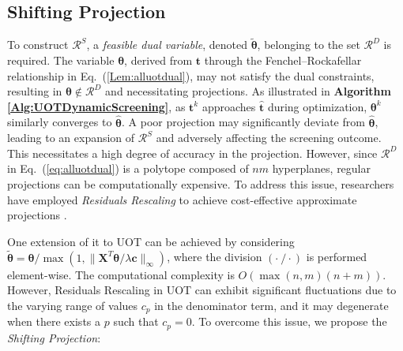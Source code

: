 \documentclass[11pt]{article}
\newcommand{\mat}[1]{\mathbf{#1}}
\renewcommand{\vec}[1]{\bm{#1}}
\begin{document}
\subsection{Shifting Projection}
\label{Sec:SP}
To construct $\mathcal{R}^S$, a {\it feasible dual variable}, denoted $\tilde{\vec{\theta}}$, belonging to the set $\mathcal{R}^{D}$ is required. The variable $\vec \theta$, derived from $\vec t$ through the Fenchel--Rockafellar relationship in Eq.~(\ref{Lem:alluotdual}), may not satisfy the dual constraints, resulting in $\vec{\theta}\notin\mathcal{R}^{D}$ and necessitating projections. As illustrated in {\bf Algorithm~ \ref{Alg:UOTDynamicScreening}}, as $\vec t^{k}$ approaches $\hat{\vec t}$ during optimization, $\vec \theta^{k}$ similarly converges to $\hat{\vec \theta}$. A poor projection may significantly deviate from $\hat{\vec{\theta}}$, leading to an expansion of $\mathcal{R}^{S}$ and adversely affecting the screening outcome. This necessitates a high degree of accuracy in the projection. However, since $\mathcal{R}^{D}$ in Eq.~(\ref{eq:alluotdual}) is a polytope composed of $nm$ hyperplanes, regular projections can be computationally expensive. To address this issue, researchers have employed {\it Residuals Rescaling} \cite{DBLP:conf/icml/MassiasSG18} to achieve cost-effective approximate projections \cite[Proposition 11]{JMLR:v18:16-577} \cite[Theorem 11]{Yamada_NIPS_2021}.

One extension of it to UOT can be achieved by considering $\tilde{\vec{\theta}} = \vec\theta /\max(1, \| \mat{X}^T\vec\theta/\lambda \vec{c}\|_{\infty})$, where the division $(\cdot\ /\cdot)$ is performed element-wise. The computational complexity is $O(\max(n,m)(n+m))$. However, Residuals Rescaling in UOT can exhibit significant fluctuations due to the varying range of values $c_p$ in the denominator term, and it may degenerate when there exists a $p$ such that $c_p = 0$. To overcome this issue, we propose the {\it Shifting Projection}:
\end{document}
